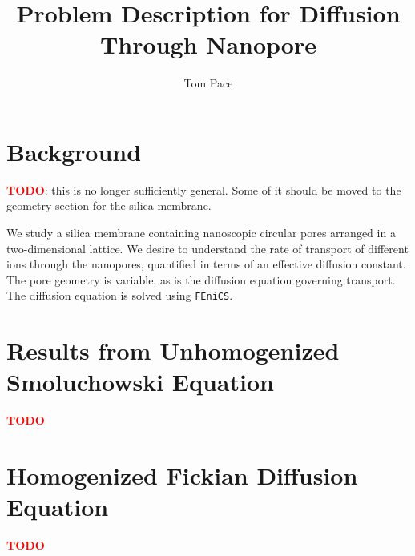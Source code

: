 \documentclass{article}
\begin{document}
\title{Problem Description for Diffusion Through Nanopore}
\author{Tom Pace}
\maketitle

\tableofcontents

\section{Background}\label{sec:background}

\textcolor{red}{\textbf{TODO}}: this is no longer sufficiently general.
Some of it should be moved to the geometry section for the silica membrane.

We study a silica membrane containing nanoscopic circular pores arranged in a two-dimensional lattice.
We desire to understand the rate of transport of different ions through the nanopores,
quantified in terms of an effective diffusion constant.
The pore geometry is variable, as is the diffusion equation governing transport.
The diffusion equation is solved using \texttt{FEniCS}.











\section{Results from Unhomogenized Smoluchowski Equation}\label{sec:res_unhom_smol}

\textcolor{red}{\textbf{TODO}}



\section{Homogenized Fickian Diffusion Equation}\label{sec:hom_fick}

\textcolor{red}{\textbf{TODO}}

\printbibliography
\end{document}
